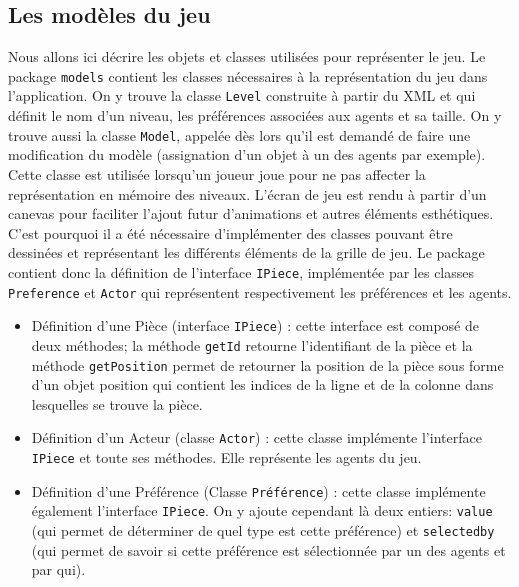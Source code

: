 \documentclass[../main.tex]{subfiles}
\begin{document}
	\subsection{Les modèles du jeu}

Nous allons ici décrire les objets et classes utilisées pour représenter le jeu. Le package \texttt{models} contient les classes nécessaires à la représentation du jeu dans l'application. On y trouve la classe \texttt{Level} construite à partir du XML et qui définit le nom d'un niveau, les préférences associées aux agents et sa taille. On y trouve aussi la classe \texttt{Model}, appelée dès lors qu'il est demandé de faire une modification du modèle (assignation d'un objet à un des agents par exemple). Cette classe est utilisée lorsqu'un joueur joue pour ne pas affecter la représentation en mémoire des niveaux. L'écran de jeu est rendu à partir d'un canevas pour faciliter l'ajout futur d'animations et autres éléments esthétiques. C'est pourquoi il a été nécessaire d'implémenter des classes pouvant être dessinées et représentant les différents éléments de la grille de jeu. Le package contient donc la définition de l'interface \texttt{IPiece}, implémentée par les classes \texttt{Preference} et \texttt{Actor} qui représentent respectivement les préférences et les agents.
\begin{itemize}
\item Définition d'une Pièce (interface \texttt{IPiece}) : cette interface est composé de deux méthodes; la méthode \texttt{getId} retourne l'identifiant de la pièce et la méthode \texttt{getPosition} permet de retourner la position de la pièce sous forme d'un objet position qui contient les indices de la ligne et de la colonne dans lesquelles se trouve la pièce.
\item Définition d'un Acteur (classe \texttt{Actor}) : cette classe implémente l'interface \texttt{IPiece} et toute ses méthodes. Elle représente les agents du jeu.                                                                                                                                                                                                                                                                                                                                      
\item Définition d'une Préférence (Classe \texttt{Préférence}) : cette classe implémente également l’interface \texttt{IPiece}. On y ajoute cependant là deux entiers: \texttt{value} (qui permet de déterminer de quel type est cette préférence) et \texttt{selectedby} (qui permet de savoir si cette préférence est sélectionnée par un des agents et par qui). 
\end{itemize}
\end{document}
